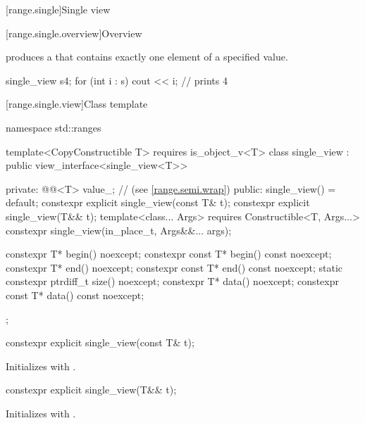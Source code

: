 [range.single]{Single view}

[range.single.overview]{Overview}

\pnum
{} produces a  that contains
exactly one element of a specified value.

\pnum
\begin{example}
\begin{codeblock}
single_view s{4};
for (int i : s)
  cout << i; // prints 4
\end{codeblock}
\end{example}

[range.single.view]{Class template }

\begin{codeblock}
namespace std::ranges {
  template<CopyConstructible T>
    requires is_object_v<T>
  class single_view : public view_interface<single_view<T>> {
  private:
    @@<T> value_;      // \expos{} (see \ref{range.semi.wrap})
  public:
    single_view() = default;
    constexpr explicit single_view(const T& t);
    constexpr explicit single_view(T&& t);
    template<class... Args>
      requires Constructible<T, Args...>
    constexpr single_view(in_place_t, Args&&... args);

    constexpr T* begin() noexcept;
    constexpr const T* begin() const noexcept;
    constexpr T* end() noexcept;
    constexpr const T* end() const noexcept;
    static constexpr ptrdiff_t size() noexcept;
    constexpr T* data() noexcept;
    constexpr const T* data() const noexcept;
  };
}
\end{codeblock}

%
\begin{itemdecl}
constexpr explicit single_view(const T& t);
\end{itemdecl}

\begin{itemdescr}
\pnum
\effects Initializes  with .
\end{itemdescr}

%
\begin{itemdecl}
constexpr explicit single_view(T&& t);
\end{itemdecl}

\begin{itemdescr}
\pnum
\effects Initializes  with .
\end{itemdescr}

